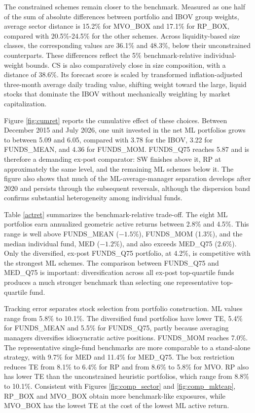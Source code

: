 \documentclass[preprint,12pt,authoryear]{elsarticle}
\begin{document}
The constrained schemes remain closer to the benchmark. Measured as one half of the sum of absolute differences between portfolio and IBOV group weights, average sector distance is 15.2\% for MVO\_BOX and 17.1\% for RP\_BOX, compared with 20.5\%-24.5\% for the other schemes. Across liquidity-based size classes, the corresponding values are 36.1\% and 48.3\%, below their unconstrained counterparts. These differences reflect the 5\% benchmark-relative individual-weight bounds. CS is also comparatively close in size composition, with a distance of 38.6\%. Its forecast score is scaled by transformed inflation-adjusted three-month average daily trading value, shifting weight toward the large, liquid stocks that dominate the IBOV without mechanically weighting by market capitalization.

Figure \ref{fig:cumret} reports the cumulative effect of these choices. Between December 2015 and July 2026, one unit invested in the net ML portfolios grows to between 5.09 and 6.05, compared with 3.78 for the IBOV, 3.22 for FUNDS\_MEAN, and 4.36 for FUNDS\_MOM. FUNDS\_Q75 reaches 5.87 and is therefore a demanding ex-post comparator: SW finishes above it, RP at approximately the same level, and the remaining ML schemes below it. The figure also shows that much of the ML-average-manager separation develops after 2020 and persists through the subsequent reversals, although the dispersion band confirms substantial heterogeneity among individual funds.

Table \ref{actret} summarizes the benchmark-relative trade-off. The eight ML portfolios earn annualized geometric active returns between 2.8\% and 4.5\%. This range is well above FUNDS\_MEAN ($-1.5\%$), FUNDS\_MOM (1.3\%), and the median individual fund, MED ($-1.2\%$), and also exceeds MED\_Q75 (2.6\%). Only the diversified, ex-post FUNDS\_Q75 portfolio, at 4.2\%, is competitive with the strongest ML schemes. The comparison between FUNDS\_Q75 and MED\_Q75 is important: diversification across all ex-post top-quartile funds produces a much stronger benchmark than selecting one representative top-quartile fund.

Tracking error separates stock selection from portfolio construction. ML values range from 5.8\% to 10.1\%. The diversified fund portfolios have lower TE, 5.4\% for FUNDS\_MEAN and 5.5\% for FUNDS\_Q75, partly because averaging managers diversifies idiosyncratic active positions. FUNDS\_MOM reaches 7.0\%. The representative single-fund benchmarks are more comparable to a stand-alone strategy, with 9.7\% for MED and 11.4\% for MED\_Q75. The box restriction reduces TE from 8.1\% to 6.4\% for RP and from 8.6\% to 5.8\% for MVO. RP also has lower TE than the unconstrained heuristic portfolios, which range from 8.8\% to 10.1\%. Consistent with Figures \ref{fig:comp_sector} and \ref{fig:comp_mktcap}, RP\_BOX and MVO\_BOX obtain more benchmark-like exposures, while MVO\_BOX has the lowest TE at the cost of the lowest ML active return.
\end{document}
